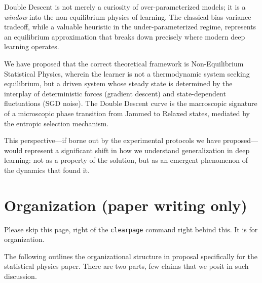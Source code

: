 \documentclass[
  journal=largetwo,
  year=2025,
  volume=37,
]{cup-journal}
\begin{document}
Double Descent is not merely a curiosity of over-parameterized models; it is a \textit{window} into the non-equilibrium physics of learning. The classical bias-variance tradeoff, while a valuable heuristic in the under-parameterized regime, represents an equilibrium approximation that breaks down precisely where modern deep learning operates.

We have proposed that the correct theoretical framework is Non-Equilibrium Statistical Physics, wherein the learner is not a thermodynamic system seeking equilibrium, but a driven system whose steady state is determined by the interplay of deterministic forces (gradient descent) and state-dependent fluctuations (SGD noise). The Double Descent curve is the macroscopic signature of a microscopic phase transition from Jammed to Relaxed states, mediated by the entropic selection mechanism.

This perspective---if borne out by the experimental protocols we have proposed---would represent a significant shift in how we understand generalization in deep learning: not as a property of the solution, but as an emergent phenomenon of the dynamics that found it.

\clearpage

\section{Organization (paper writing only)}

Please skip this page, right of the \texttt{clearpage} command right behind this. It is for organization. 

The following outlines the organizational structure in proposal specifically for the statistical physics paper. There are two parts, few claims that we posit in such discussion. 
\end{document}
